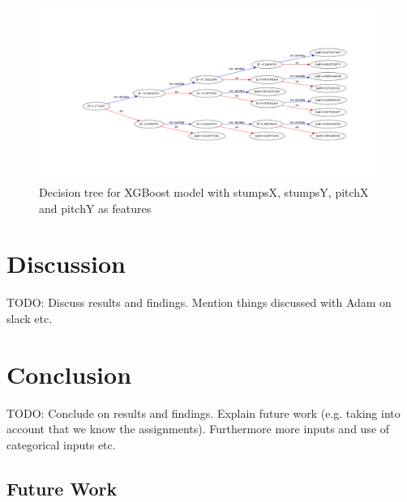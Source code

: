 \documentclass[12pt,a4paper]{report}
\theoremstyle{definition}
\begin{document}
\begin{figure}[H]
    \centering
    \includegraphics[width=\linewidth]{tree_stumps_pitch.png}
    \caption{Decision tree for XGBoost model with stumpsX, stumpsY, pitchX and pitchY as features}
    \label{fig:TreeStumpsPitch}
\end{figure}

\chapter{Discussion}

TODO: Discuss results and findings. Mention things discussed with Adam on slack etc.

\chapter{Conclusion}

TODO: Conclude on results and findings. Explain future work (e.g. taking into account that we know the assignments). Furthermore more inputs and use of categorical inputs etc.

\section{Future Work}

\end{document}
